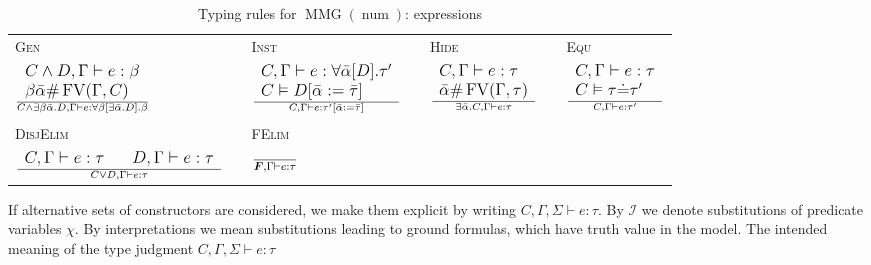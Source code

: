 \documentclass{article}
\newcommand{\assign}{:=}
\newcommand{\tmmathbf}[1]{\ensuremath{\boldsymbol{#1}}}
\newcommand{\tmname}[1]{\textsc{#1}}
\newcommand{\tmop}[1]{\ensuremath{\operatorname{#1}}}
\begin{document}
\begin{table}[t]
  \begin{tabular}{lllllll}
    {\tmname{Gen}} &  & {\tmname{Inst}} &  & {\tmname{Hide}} &  &
    {\tmname{Equ}}\\
    $\large{\frac{\begin{array}{l}
      C \wedge D, \Gamma \vdash e : \beta\\
      \beta \bar{\alpha} \# \tmop{FV} (\Gamma, C)
    \end{array}}{C \wedge \exists \beta \bar{\alpha} .D, \Gamma \vdash e :
    \forall \beta [\exists \bar{\alpha} .D] . \beta}}$ &  &
    $\large{\frac{\begin{array}{l}
      C, \Gamma \vdash e : \forall \bar{\alpha} [D] . \tau^{\prime}\\
      C \vDash D [\bar{\alpha} \assign \bar{\tau}]
    \end{array}}{C, \Gamma \vdash e : \tau^{\prime} [\bar{\alpha} \assign
    \bar{\tau}]}}$ &  & $\large{\frac{\begin{array}{l}
      C, \Gamma \vdash e : \tau\\
      \bar{\alpha} \# \tmop{FV} (\Gamma, \tau)
    \end{array}}{\exists \bar{\alpha} .C, \Gamma \vdash e : \tau}}$ &  &
    $\large{\frac{\begin{array}{l}
      C, \Gamma \vdash e : \tau\\
      C \vDash \tau \dot{=} \tau^{\prime}
    \end{array}}{C, \Gamma \vdash e : \tau^{\prime}}}$\\
    &  &  &  &  &  & \\
    {\tmname{DisjElim}} &  & {\tmname{FElim}} &  &  &  & \\
    $\large{\frac{\begin{array}{lll}
      C, \Gamma \vdash e : \tau &  & D, \Gamma \vdash e : \tau
    \end{array}}{C \vee D, \Gamma \vdash e : \tau}}$ &  &
    $\large{\frac{}{\tmmathbf{F}, \Gamma \vdash e : \tau}}$ &  &  &  & 
  \end{tabular}
  
  \label{TypRulExpr}
  \caption{Typing rules for $\tmop{MMG} (\tmop{num})$: expressions}
\end{table} If alternative sets of constructors are considered, we make them
explicit by writing $C, \Gamma, \Sigma \vdash e : \tau$. By $\mathcal{I}$ we
denote substitutions of predicate variables $\chi$. By interpretations we mean
substitutions leading to ground formulas, which have truth value in the model.
The intended meaning of the type judgment $C, \Gamma, \Sigma \vdash e : \tau$
\end{document}
